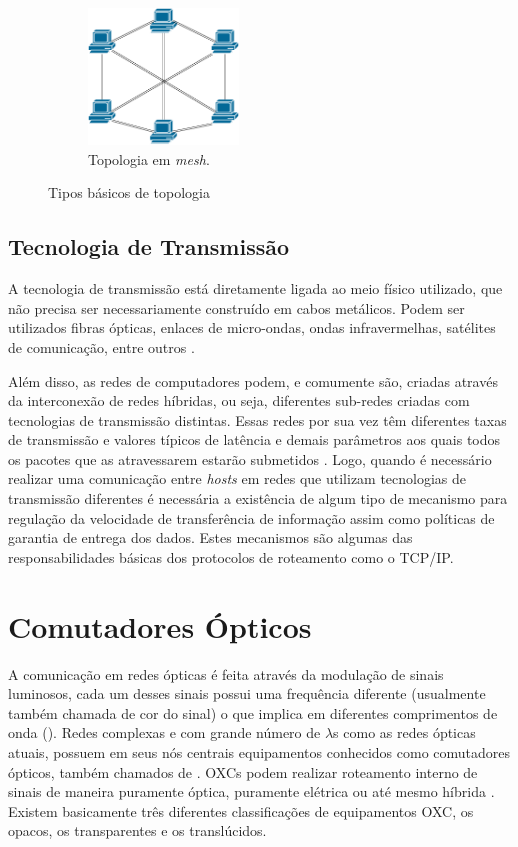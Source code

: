 \begin{figure}[t!]
\begin{subfigure}[t]{0.4\textwidth}
	\end{subfigure}
	~
	\begin{subfigure}[t]{0.4\textwidth}
		\centering
		\includegraphics[width=4cm]{./figuras/Topologia-Mesh.pdf} %
	\caption{Topologia em \emph{mesh}.}
	\label{fig_topologia_multiplo_mesh}
	\end{subfigure}
	\caption{Tipos básicos de topologia}
	\label{fig_topologia_multiplo}
\end{figure}

\subsection{Tecnologia de Transmissão}
A tecnologia de transmissão está diretamente ligada ao meio físico utilizado, que não precisa ser necessariamente construído em cabos metálicos. Podem ser utilizados fibras ópticas, enlaces de micro-ondas, ondas infravermelhas, satélites de comunicação, entre outros \cite{Book-Tanenbaum2003}. 

Além disso, as redes de computadores podem, e comumente são, criadas através da interconexão de redes híbridas, ou seja, diferentes sub-redes criadas com tecnologias de transmissão distintas. Essas redes por sua vez têm diferentes taxas de transmissão e valores típicos de latência e demais parâmetros aos quais todos os pacotes que as atravessarem estarão submetidos \cite{Book-Kurose2013}. Logo, quando é necessário realizar uma comunicação entre \emph{hosts} em redes que utilizam tecnologias de transmissão diferentes é necessária a existência de algum tipo de mecanismo para regulação da velocidade de transferência de informação assim como políticas de garantia de entrega dos dados. Estes mecanismos são algumas das responsabilidades básicas dos protocolos de roteamento como o TCP/IP.

\section{Comutadores Ópticos}
A comunicação em redes ópticas é feita através da modulação de sinais luminosos, cada um desses sinais possui uma frequência diferente (usualmente também chamada de cor do sinal) o que implica em diferentes comprimentos de onda (). Redes complexas e com grande número de $\lambda$s  como as redes ópticas atuais, possuem em seus nós centrais equipamentos conhecidos como comutadores ópticos, também chamados de . OXCs podem realizar roteamento interno de sinais de maneira puramente óptica, puramente elétrica ou até mesmo híbrida \cite{Book-Ramaswami2010}. Existem basicamente três diferentes classificações de equipamentos OXC, os opacos, os transparentes e os translúcidos.

